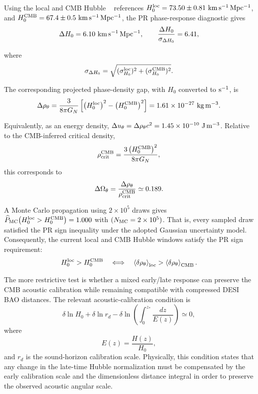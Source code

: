 \documentclass[11pt]{article}
\begin{document}
Using the local and CMB Hubble ~\cite{H0DN2026,Planck2018Cosmology} references
$H_0^{\rm loc} = 73.50\pm0.81\ {\rm km\,s^{-1}\,Mpc^{-1}}$, and $H_0^{\rm CMB} = 67.4\pm0.5\ {\rm km\,s^{-1}\,Mpc^{-1}}$, the PR phase-response diagnostic gives
\begin{equation}
\Delta H_0
=
6.10\ {\rm km\,s^{-1}\,Mpc^{-1}},
\qquad
\frac{\Delta H_0}{\sigma_{\Delta H_0}}
=
6.41,
\end{equation}

where
\begin{equation}
\sigma_{\Delta H_0}
=
\sqrt{
(\sigma_{H_0}^{\rm loc})^2
+
(\sigma_{H_0}^{\rm CMB})^2
}.
\end{equation}

The corresponding projected phase-density gap, with \(H_0\) converted to \({\rm s^{-1}}\), is
\begin{equation}
\Delta\rho_\theta
=
\frac{3}{8\pi G_N}
\left[
\left(H_0^{\rm loc}\right)^2
-
\left(H_0^{\rm CMB}\right)^2
\right]
=
1.61\times10^{-27}\ {\rm kg\,m^{-3}}.
\end{equation}

Equivalently, as an energy density, $\Delta u_\theta = \Delta\rho_\theta c^2
= 1.45\times10^{-10}\ {\rm J\,m^{-3}}$. Relative to the CMB-inferred critical density,
\begin{equation}
\rho_{\rm crit}^{\rm CMB}
=
\frac{3\left(H_0^{\rm CMB}\right)^2}{8\pi G_N},
\end{equation}
this corresponds to
\begin{equation}
\Delta\Omega_\theta
=
\frac{\Delta\rho_\theta}{\rho_{\rm crit}^{\rm CMB}}
\simeq
0.189.
\end{equation}

A Monte Carlo propagation using \(2\times10^5\) draws gives $\widehat P_{\rm MC} \!\left(H_0^{\rm loc}>H_0^{\rm CMB}\right)=1.000$
with $(N_{\rm MC}=2\times10^5)$. That is, every sampled draw satisfied the PR sign inequality under the adopted Gaussian uncertainty model. Consequently, the current local and CMB Hubble windows satisfy the PR sign requirement:
\begin{equation}
H_0^{\rm loc}>H_0^{\rm CMB}
\quad
\Longleftrightarrow
\quad
\left\langle
\delta\rho_\theta
\right\rangle_{\rm loc}
>
\left\langle
\delta\rho_\theta
\right\rangle_{\rm CMB}.
\end{equation}

The more restrictive test is whether a mixed early/late response can preserve the CMB acoustic calibration while remaining compatible with compressed DESI BAO distances. 
The relevant acoustic-calibration condition is
\begin{equation}
\boxed{
\delta\ln H_0
+
\delta\ln r_d
-
\delta\ln
\left(
\int_0^{z_*}
\frac{dz}{E(z)}
\right)
\simeq
0,
}
\end{equation}
where
\begin{equation}
\boxed{
E(z)
=
\frac{H(z)}{H_0},
}
\end{equation}
and \(r_d\) is the sound-horizon calibration scale. 
Physically, this condition states that any change in the late-time Hubble normalization must be compensated by the early calibration scale and the dimensionless distance integral in order to preserve the observed acoustic angular scale.
\end{document}
